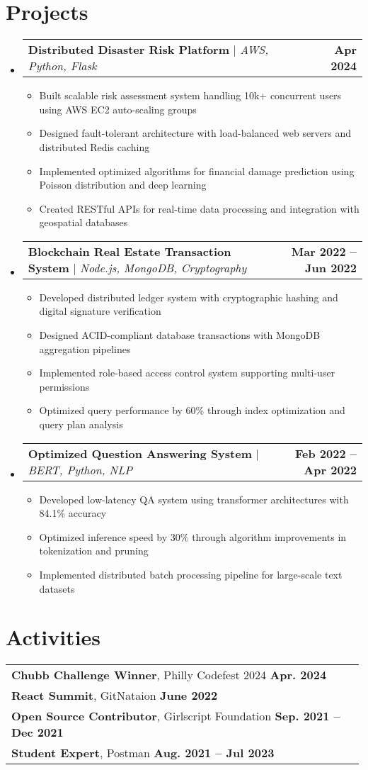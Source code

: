 \documentclass[letterpaper,11pt]{article}
\makeatletter
\newcommand{\resumeItem}[1]{
  \item\small{
    {#1 \vspace{-2pt}}
  }
}
\newcommand{\resumeProjectHeading}[2]{
    \item
    \begin{tabular*}{1.001\textwidth}{l@{\extracolsep{\fill}}r}
      \small#1 & \textbf{\small #2}\\
    \end{tabular*}\vspace{-3pt}
}
\newcommand{\resumeSubHeadingListStart}{\begin{itemize}[leftmargin=0.0in, label={}]}
\newcommand{\resumeSubHeadingListEnd}{\end{itemize}}
\newcommand{\resumeItemListStart}{\begin{itemize}}
\newcommand{\resumeItemListEnd}{\end{itemize}\vspace{-5pt}}
\makeatother
\begin{document}
\section{Projects}
\vspace{-5pt}
\resumeSubHeadingListStart
    \resumeProjectHeading
    {\textbf{Distributed Disaster Risk Platform} $|$ \emph{AWS, Python, Flask}} {Apr 2024}
    \resumeItemListStart
        \resumeItem{Built scalable risk assessment system handling 10k+ concurrent users using AWS EC2 auto-scaling groups}
        \resumeItem{Designed fault-tolerant architecture with load-balanced web servers and distributed Redis caching}
        \resumeItem{Implemented optimized algorithms for financial damage prediction using Poisson distribution and deep learning}
        \resumeItem{Created RESTful APIs for real-time data processing and integration with geospatial databases}
    \resumeItemListEnd
    \resumeProjectHeading
    {\textbf{Blockchain Real Estate Transaction System} $|$ \emph{Node.js, MongoDB, Cryptography}} {Mar 2022 -- Jun 2022}
    \resumeItemListStart
        \resumeItem{Developed distributed ledger system with cryptographic hashing and digital signature verification}
        \resumeItem{Designed ACID-compliant database transactions with MongoDB aggregation pipelines}
        \resumeItem{Implemented role-based access control system supporting multi-user permissions}
        \resumeItem{Optimized query performance by 60\% through index optimization and query plan analysis}
    \resumeItemListEnd
    \resumeProjectHeading
    {\textbf{Optimized Question Answering System} $|$ \emph{BERT, Python, NLP}} {Feb 2022 -- Apr 2022}
    \resumeItemListStart
        \resumeItem{Developed low-latency QA system using transformer architectures with 84.1\% accuracy}
        \resumeItem{Optimized inference speed by 30\% through algorithm improvements in tokenization and pruning}
        \resumeItem{Implemented distributed batch processing pipeline for large-scale text datasets}
    \resumeItemListEnd
\resumeSubHeadingListEnd

\section{Activities}
\begin{tabular}{p{0.99\linewidth}}
    \hspace{0.15in}\textbf{Chubb Challenge Winner}, Philly Codefest 2024
        \hfill \textbf{Apr. 2024} \\
            \hspace{0.15in}\textbf{React Summit}, GitNataion
        \hfill \textbf{June 2022}\\
    \hspace{0.15in}\textbf{Open Source Contributor}, Girlscript Foundation
        \hfill \textbf{Sep. 2021 -- Dec 2021}\\

    \hspace{0.15in}\textbf{Student Expert}, Postman
        \hfill \textbf{Aug. 2021 -- Jul 2023} 
    
\end{tabular}
\vspace{-15pt}
\end{document}
